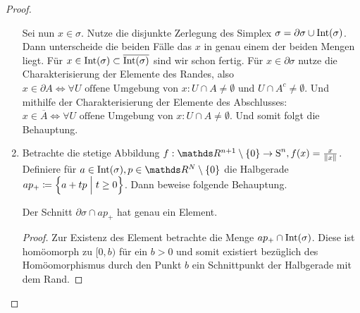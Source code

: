 \begin{Satz}
\begin{proof}
\begin{enumerate}[$a)$:]
        Sei nun $x \in \sigma$. Nutze die disjunkte Zerlegung des
        Simplex $\sigma = \partial\sigma \cup \operatorname{Int}(\sigma)$. Dann
        unterscheide die beiden Fälle das $x$ in genau einem der
        beiden Mengen liegt. Für
        $x \in \operatorname{Int}(\sigma) \subset \overline{\operatorname{Int}(\sigma)}$ sind wir
        schon fertig. Für $x \in \partial\sigma$ nutze die
        Charakterisierung der Elemente des Randes, also
        $x \in \partial A \Leftrightarrow \forall U \text{ offene
          Umgebung von } x : U \cap A \not= \emptyset \text{ und } U
        \cap A^c \not= \emptyset $.
        Und mithilfe der Charakterisierung der Elemente des
        Abschlusses:
        $ x \in \overline{A} \Leftrightarrow \forall U \text{ offene
          Umgebung von }x : U \cap A \not= \emptyset$.
        Und somit folgt die Behauptung.

      \item Betrachte die stetige Abbildung
        $f : \R^{n+1} \setminus \sset{0} \rightarrow \Sp^{n}, f(x) =
        \frac{x}{\nn[x]}$.
        Definiere für
        $a \in \Int(\sigma), p \in \R^N \setminus \{ 0 \}$ die
        Halbgerade $ap_+ \coloneqq \left\{  a + tp \; \Big| \;  t \geq 0 \right\}$. Dann
        beweise folgende Behauptung.
      \begin{Beh}
        Der Schnitt $\partial\sigma \cap ap_+$ hat genau ein Element.
        \begin{proof}
          Zur Existenz des Element betrachte die Menge
          $ap_+ \cap \operatorname{Int}(\sigma)$.  Diese ist homöomorph zu $[0,b)$
          für ein $b>0$ und somit existiert bezüglich des
          Homöomorphismus durch den Punkt $b$ ein Schnittpunkt der
          Halbgerade mit dem Rand.
          

\end{proof}
\end{Beh}
\end{enumerate}
\end{proof}
\end{Satz}
